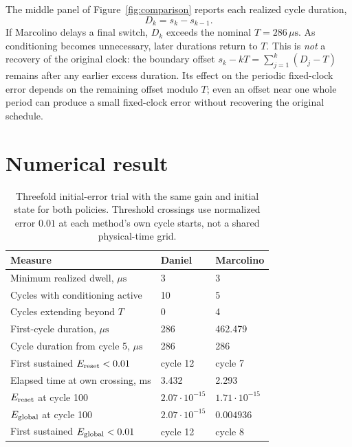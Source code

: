 \documentclass[11pt,a4paper]{article}
\begin{document}
The middle panel of Figure~\ref{fig:comparison} reports each realized cycle duration,
\begin{equation}
 D_k=s_k-s_{k-1}.
\end{equation}
If Marcolino delays a final switch, $D_k$ exceeds the nominal $T=286\,\mu\mathrm{s}$. As conditioning becomes unnecessary, later durations return to $T$. This is \emph{not} a recovery of the original clock: the boundary offset $s_k-kT=\sum_{j=1}^k(D_j-T)$ remains after any earlier excess duration. Its effect on the periodic fixed-clock error depends on the remaining offset modulo $T$; even an offset near one whole period can produce a small fixed-clock error without recovering the original schedule.

\section{Numerical result}

\begin{table}[ht]
\centering
\caption{Threefold initial-error trial with the same gain and initial state for both policies. Threshold crossings use normalized error $0.01$ at each method's own cycle starts, not a shared physical-time grid.}
\label{tab:comparison}
\small
\setlength{\tabcolsep}{3pt}
\begin{tabular}{@{}p{.63\linewidth}p{.14\linewidth}p{.18\linewidth}@{}}
\toprule
Measure & Daniel & Marcolino\\
\midrule
Minimum realized dwell, $\mu\mathrm{s}$ & 3 & 3\\
Cycles with conditioning active & 10 & 5\\
Cycles extending beyond $T$ & 0 & 4\\
First-cycle duration, $\mu\mathrm{s}$ & 286 & 462.479\\
Cycle duration from cycle 5, $\mu\mathrm{s}$ & 286 & 286\\
First sustained $E_{\rm reset}<0.01$ & cycle 12 & cycle 7\\
Elapsed time at own crossing, ms & 3.432 & 2.293\\
$E_{\rm reset}$ at cycle 100 & $2.07\cdot10^{-15}$ & $1.71\cdot10^{-15}$\\
$E_{\rm global}$ at cycle 100 & $2.07\cdot10^{-15}$ & $0.004936$\\
First sustained $E_{\rm global}<0.01$ & cycle 12 & cycle 8\\
\bottomrule
\end{tabular}
\end{table}
\end{document}
